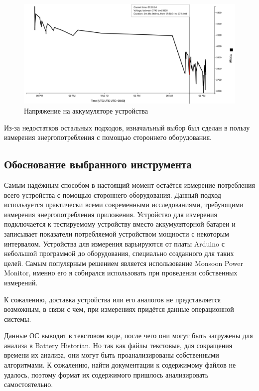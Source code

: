 \documentclass[a4paper,14pt]{extarticle} %
\begin{document}
	\begin{figure}[htb]
		\includegraphics[width=\textwidth]{historian_voltage}
		\caption{Напряжение на аккумуляторе устройства}
		\label{fig:historian_voltage}
	\end{figure}

	Из-за недостатков остальных подходов, изначальный выбор был сделан в пользу измерения энергопотребления с помощью стороннего оборудования.
	
	\subsection{Обоснование выбранного инструмента}
	
	Самым надёжным способом в настоящий момент остаётся измерение потребления всего устройства с помощью стороннего оборудования. Данный подход используется практически всеми современными исследованиями, требующими измерения энергопотребления приложения. Устройство для измерения подключается к тестируемому устройству вместо аккумуляторной батареи и записывает показатели потребляемой устройством мощности с некоторым интервалом. Устройства для измерения варьируются от платы Arduino с небольшой программой до оборудования, специально созданного для таких целей. Самым популярным решением является использование Monsoon Power Monitor, именно его я собирался использовать при проведении собственных измерений.
	
	К сожалению, доставка устройства или его аналогов не представляется возможным, в связи с чем, при измерениях придётся данные операционной системы.
	
	Данные ОС выводит в текстовом виде, после чего они могут быть загружены для анализа в Battery Historian. Но так как файлы текстовые, для сокращения времени их анализа, они могут быть проанализированы собственными алгоритмами. К сожалению, найти документации к содержимому файлов не удалось, поэтому формат их содержимого пришлось анализировать самостоятельно.
	
\end{document}

